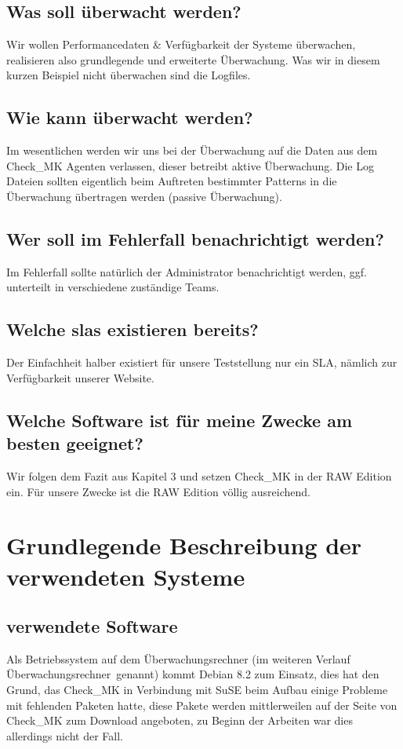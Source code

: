 \documentclass[12pt,a4paper,parskip,listof=totoc,bibliography=totoc]{scrreprt}
\begin{document}
	\subsection{Was soll überwacht werden?}
	Wir wollen Performancedaten \& Verfügbarkeit der Systeme überwachen, realisieren also grundlegende und erweiterte Überwachung. Was wir in diesem kurzen Beispiel nicht überwachen sind die Logfiles.
	\subsection{Wie kann überwacht werden?}
	Im wesentlichen werden wir uns bei der Überwachung auf die Daten aus dem Check\_MK Agenten verlassen, dieser betreibt aktive Überwachung.
	Die Log Dateien sollten eigentlich beim Auftreten bestimmter Patterns in die Überwachung übertragen werden (passive Überwachung).
	\subsection{Wer soll im Fehlerfall benachrichtigt werden?}
	Im Fehlerfall sollte natürlich der Administrator benachrichtigt werden, ggf. unterteilt in verschiedene zuständige Teams.
	\subsection{Welche \acrlong{sla}s existieren bereits?}
	Der Einfachheit halber existiert für unsere Teststellung nur ein SLA, nämlich zur Verfügbarkeit unserer Website.
	\subsection{Welche Software ist für meine Zwecke am besten geeignet?}
	Wir folgen dem Fazit aus Kapitel 3 und setzen Check\_MK in der RAW Edition ein. Für unsere Zwecke ist die RAW Edition völlig ausreichend.
	\section{Grundlegende Beschreibung der verwendeten Systeme}
	\subsection{verwendete Software}
	Als Betriebssystem auf dem Überwachungsrechner (im weiteren Verlauf \glqq Überwachungsrechner\grqq\ genannt) kommt Debian 8.2 zum Einsatz, dies hat den Grund, das Check\_MK in Verbindung mit SuSE beim Aufbau einige Probleme mit fehlenden Paketen hatte, diese Pakete werden mittlerweilen auf der Seite von Check\_MK zum Download angeboten, zu Beginn der Arbeiten war dies allerdings nicht der Fall.
	
\end{document}
